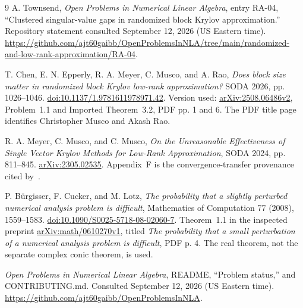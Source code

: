 \documentclass[11pt]{article}
\numberwithin{equation}{section}
\theoremstyle{definition}
\begin{document}
\clearpage
\begin{thebibliography}{9}
A. Townsend, \emph{Open Problems in Numerical Linear Algebra}, entry RA-04, ``Clustered singular-value gaps in randomized block Krylov approximation.'' Repository statement consulted September 12, 2026 (US Eastern time).
\url{https://github.com/ajt60gaibb/OpenProblemsInNLA/tree/main/randomized-and-low-rank-approximation/RA-04}.

T. Chen, E. N. Epperly, R. A. Meyer, C. Musco, and A. Rao,
\emph{Does block size matter in randomized block Krylov low-rank approximation?}
SODA 2026, pp. 1026--1046.
\href{https://doi.org/10.1137/1.9781611978971.42}{doi:10.1137/1.9781611978971.42}.
Version used: \href{https://arxiv.org/abs/2508.06486v2}{arXiv:2508.06486v2}, Problem~1.1 and Imported Theorem~3.2, PDF pp. 1 and 6. The PDF title page identifies Christopher Musco and Akash Rao.

R. A. Meyer, C. Musco, and C. Musco,
\emph{On the Unreasonable Effectiveness of Single Vector Krylov Methods for Low-Rank Approximation}, SODA 2024, pp. 811--845.
\href{https://arxiv.org/abs/2305.02535}{arXiv:2305.02535}.
Appendix~F is the convergence-transfer provenance cited by~\cite{chen}.

P. B\"urgisser, F. Cucker, and M. Lotz,
\emph{The probability that a slightly perturbed numerical analysis problem is difficult}, Mathematics of Computation 77 (2008), 1559--1583.
\href{https://doi.org/10.1090/S0025-5718-08-02060-7}{doi:10.1090/S0025-5718-08-02060-7}.
Theorem~1.1 in the inspected preprint \href{https://arxiv.org/abs/math/0610270v1}{arXiv:math/0610270v1}, titled \emph{The probability that a small perturbation of a numerical analysis problem is difficult}, PDF p. 4. The real theorem, not the separate complex conic theorem, is used.

\emph{Open Problems in Numerical Linear Algebra}, README, ``Problem status,'' and CONTRIBUTING.md. Consulted September 12, 2026 (US Eastern time).
\url{https://github.com/ajt60gaibb/OpenProblemsInNLA}.
\end{thebibliography}
\end{document}
